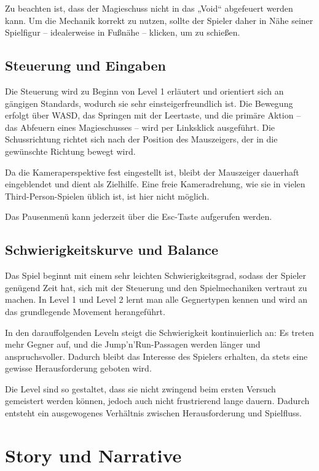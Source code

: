 \documentclass[oneside]{ausarbeitung}
\begin{document}
Zu beachten ist, dass der Magieschuss nicht in das „Void“ abgefeuert werden kann. Um die Mechanik korrekt zu nutzen, sollte der Spieler daher in Nähe seiner Spielfigur – idealerweise in Fußnähe – klicken, um zu schießen. 


\section{Steuerung und Eingaben}
\label{sec:steuerungundeingaben}

Die Steuerung wird zu Beginn von Level 1 erläutert und orientiert sich an gängigen Standards, wodurch sie sehr einsteigerfreundlich ist.
Die Bewegung erfolgt über WASD, das Springen mit der Leertaste, und die primäre Aktion – das Abfeuern eines Magieschusses – wird per Linksklick ausgeführt.
Die Schussrichtung richtet sich nach der Position des Mauszeigers, der in die gewünschte Richtung bewegt wird.

Da die Kameraperspektive fest eingestellt ist, bleibt der Mauszeiger dauerhaft eingeblendet und dient als Zielhilfe. Eine freie Kameradrehung, wie sie in vielen Third-Person-Spielen üblich ist, ist hier nicht möglich.

Das Pausenmenü kann jederzeit über die Esc-Taste aufgerufen werden.


\section{Schwierigkeitskurve und Balance}
\label{sec:schwierigkeitskurveundbalance}

Das Spiel beginnt mit einem sehr leichten Schwierigkeitsgrad, sodass der Spieler genügend Zeit hat, sich mit der Steuerung und den Spielmechaniken vertraut zu machen.
In Level 1 und Level 2 lernt man alle Gegnertypen kennen und wird an das grundlegende Movement herangeführt.

In den darauffolgenden Leveln steigt die Schwierigkeit kontinuierlich an: Es treten mehr Gegner auf, und die Jump’n’Run-Passagen werden länger und anspruchsvoller.
Dadurch bleibt das Interesse des Spielers erhalten, da stets eine gewisse Herausforderung geboten wird.

Die Level sind so gestaltet, dass sie nicht zwingend beim ersten Versuch gemeistert werden können, jedoch auch nicht frustrierend lange dauern. Dadurch entsteht ein ausgewogenes Verhältnis zwischen Herausforderung und Spielfluss.


\chapter{Story und Narrative}
\label{cha:stroyundnarrative}
\end{document}
